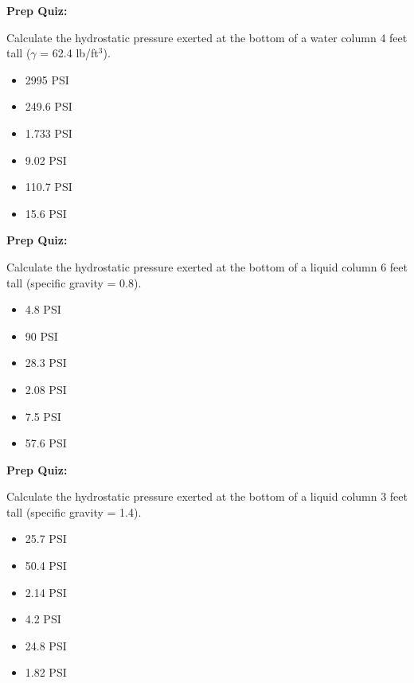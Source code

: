 \vfil \eject

\noindent
{\bf Prep Quiz:}

Calculate the hydrostatic pressure exerted at the bottom of a water column 4 feet tall ($\gamma$ = 62.4 lb/ft$^{3}$).

\begin{itemize}
\item{} 2995 PSI
\vskip 5pt 
\item{} 249.6 PSI
\vskip 5pt 
\item{} 1.733 PSI
\vskip 5pt 
\item{} 9.02 PSI
\vskip 5pt 
\item{} 110.7 PSI
\vskip 5pt 
\item{} 15.6 PSI
\end{itemize}














\vfil \eject

\noindent
{\bf Prep Quiz:}

Calculate the hydrostatic pressure exerted at the bottom of a liquid column 6 feet tall (specific gravity = 0.8).

\begin{itemize}
\item{} 4.8 PSI
\vskip 5pt 
\item{} 90 PSI
\vskip 5pt 
\item{} 28.3 PSI
\vskip 5pt 
\item{} 2.08 PSI
\vskip 5pt 
\item{} 7.5 PSI
\vskip 5pt 
\item{} 57.6 PSI
\end{itemize}














\vfil \eject

\noindent
{\bf Prep Quiz:}

Calculate the hydrostatic pressure exerted at the bottom of a liquid column 3 feet tall (specific gravity = 1.4).

\begin{itemize}
\item{} 25.7 PSI
\vskip 5pt 
\item{} 50.4 PSI
\vskip 5pt 
\item{} 2.14 PSI
\vskip 5pt 
\item{} 4.2 PSI
\vskip 5pt 
\item{} 24.8 PSI
\vskip 5pt 
\item{} 1.82 PSI
\end{itemize}









